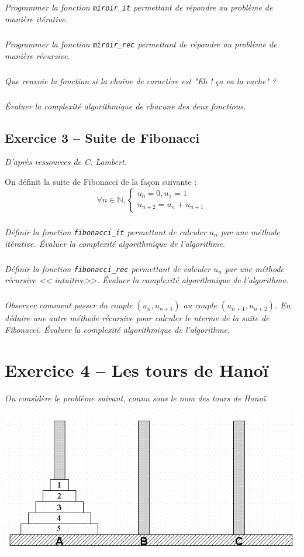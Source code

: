 \subparagraph{}
\textit{Programmer la fonction \texttt{miroir\_it} permettant de répondre au problème de manière itérative.}


\subparagraph{}
\textit{Programmer la fonction \texttt{miroir\_rec} permettant de répondre au problème de manière récursive.}


\subparagraph{}
\textit{Que renvoie la fonction si la chaîne de caractère est "Eh ! ça va la vache" ?}
 
 \subparagraph{}
\textit{Évaluer la complexité algorithmique de chacune des deux fonctions.}

 
\subsection*{Exercice 3 -- Suite de Fibonacci}
\textit{D'après ressources de C. Lambert.}

\setcounter{subparagraph}{0}
On définit la suite de Fibonacci de la façon suivante : 
$$
\forall n\in \mathbb{N}, \left\{ \begin{array}{l}
u_0 = 0, u_1 = 1 \\
u_{n+2} = u_{n} + u_{n+1}
\end{array}\right.
$$

\subparagraph{}
\textit{Définir la fonction \texttt{fibonacci\_it} permettant de calculer $u_n$ par une méthode itérative. Évaluer la 
complexité algorithmique de l'algorithme.}

\subparagraph{}
\textit{Définir la fonction \texttt{fibonacci\_rec} permettant de calculer $u_n$ par une méthode récursive << 
intuitive>>. Évaluer la complexité algorithmique de l'algorithme.}


\subparagraph{}
\textit{Observer comment passer du couple $(u_n,u_{n+1})$ au couple $(u_{n+1},u_{n+2})$. En déduire une autre méthode 
récursive pour calculer le n\ieme terme de la suite de Fibonacci. Évaluer la complexité algorithmique de l'algorithme.}


\section*{Exercice 4 -- Les tours de Hanoï}
\setcounter{subparagraph}{0}

\textit{On considère le problème suivant, connu sous le nom des \emph{tours de Hanoï}.}

\begin{center}
\includegraphics[scale=0.3]{images/hanoi.png}
\end{center}

